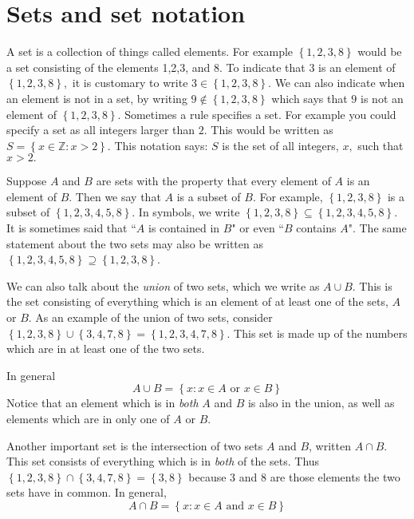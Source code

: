 \section{Sets and set notation}

A set is a collection of things called elements.
For example $\left\{ 1,2,3,8\right\} $
would be a set consisting of the elements 1,2,3, and 8. To indicate that $3$
is an element of $\left\{ 1,2,3,8\right\} ,$ it is customary to write $3\in
\left\{ 1,2,3,8\right\} .$ We can also indicate when an element is not in a set, 
by writing $9\notin \left\{ 1,2,3,8\right\} $ which says that $9$ is
not an element of $\left\{ 1,2,3,8\right\} .$ Sometimes a rule specifies a
set. For example you could specify a set as all integers larger than $2.$
This would be written as $S=\left\{ x\in \mathbb{Z}:x>2\right\} .$ This
notation says: $S$ is the set of all integers, $x,$ such that $x>2.$

Suppose $A$ and $B$ are sets with the property that every element of $A$ is an
element of $B$. Then we say that $A$ is a subset of $B.$ For example, $\left\{
1,2,3,8\right\} $ is a subset of $\left\{ 1,2,3,4,5,8\right\}.$ In symbols, we write
$\left\{ 1,2,3,8\right\} \subseteq \left\{ 1,2,3,4,5,8\right\} .$ It is
sometimes said that ``$A$ is contained in $B$" or even ``$B$ contains $A$".
The same statement about the two sets may also be written as $\left\{
1,2,3,4,5,8\right\} \supseteq \left\{ 1,2,3,8\right\} $.

We can also talk about the {\em union\em} of two sets, which we write as $A \cup B$. This is the set consisting of everything which is an
element of at least one of the sets, $A$ or $B$. As an example of the union
of two sets, consider $\left\{ 1,2,3,8\right\} \cup \left\{ 3,4,7,8\right\} =\left\{
1,2,3,4,7,8\right\} $. This set is made up of the numbers which are in at least
one of the two sets.\index{$\cup$}

In general
\begin{equation*}
A\cup B = \left\{ x:x\in A
\text{ or }x\in B\right\} 
\end{equation*}
Notice that an element which is in {\em both\em} $A$ and $B$ is also in the
union, as well as elements which are in only one of $A$ or $B$. 

Another important set is the intersection\index{$\cap$} of two sets $A$ and $B$, written $A \cap B$. This set consists of everything which is in
{\em both\em} of the sets. Thus $\left\{ 1,2,3,8\right\} \cap \left\{ 3,4,7,8\right\}
=\left\{ 3,8\right\} $ because $3$ and $8$ are those elements the two sets
have in common. In general,
\begin{equation*}
A\cap B =  \left\{ x:x\in A\text{ and }x\in B\right\} 
\end{equation*}

